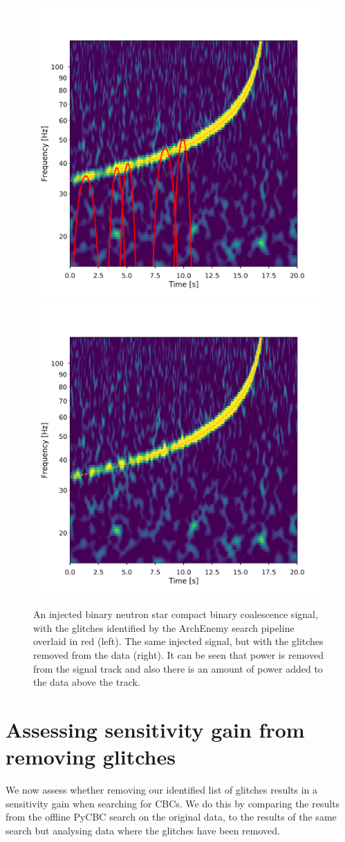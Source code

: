 \begin{figure}
  \centering
  \begin{minipage}[t]{1.0\linewidth}
    \includegraphics[width=0.49\linewidth]{images/4_archenemy/Section3/3.8/L1_loud_Original.pdf}
    \hspace{0.02\linewidth}
    \includegraphics[width=0.49\linewidth]{images/4_archenemy/Section3/3.8/L1_loud_Subtracted.pdf}
  \end{minipage}
    \caption{An injected binary neutron star compact binary coalescence \gwadj signal, with the \scladj glitches identified by the ArchEnemy search pipeline overlaid in red (left). The same injected signal, but with the \scladj glitches removed from the data (right). It can be seen that power is removed from the signal track and also there is an amount of power added to the data above the track.}
    \label{4:fig:loud_inj}
\end{figure}

\section{\label{4:sec:results}Assessing sensitivity gain from removing \scladj glitches}

We now assess whether removing our identified list of \scladj glitches results in a sensitivity gain when searching for CBCs. We do this by comparing the results from the offline PyCBC search on the original data, to the results of the same search but analysing data where the glitches have been removed.

